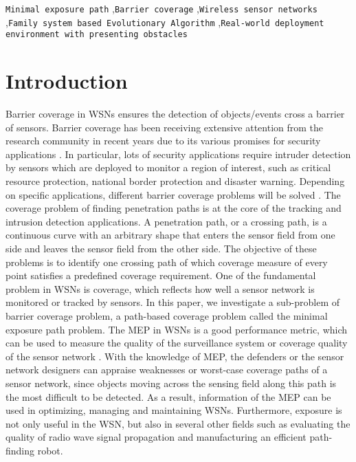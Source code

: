 \documentclass[final]{elsarticle}
\begin{document}
\begin{frontmatter}
\begin{abstract}
\end{abstract}
\begin{keyword}
\texttt{Minimal exposure path} \sep\texttt{Barrier coverage} \sep \texttt{Wireless sensor networks} \sep \texttt{Family system based Evolutionary Algorithm} \sep \texttt{Real-world deployment environment with presenting obstacles}
\end{keyword}
\end{frontmatter}
\section{Introduction}
Barrier coverage in WSNs ensures the detection of objects/events cross a barrier of sensors. Barrier coverage has been receiving extensive attention from the research community in recent years due to its various promises for security applications \cite{wu2016survey,wang2011coverage,b15}. In particular, lots of security applications require intruder detection by sensors which are deployed to monitor a region of interest, such as critical resource protection, national border protection and disaster warning. Depending on specific applications, different barrier coverage problems will be solved . The coverage problem of finding penetration paths is at the core of the tracking and intrusion detection applications. A penetration path, or a crossing path, is a continuous curve with an arbitrary shape that enters the sensor field from one side and leaves the sensor field from the other side. The objective of these problems is to identify one crossing path of which coverage measure of every point satisfies a predefined coverage requirement. One of the fundamental problem in WSNs is coverage, which reflects how well a sensor network is monitored or tracked by sensors. In this paper, we investigate a sub-problem of barrier coverage problem, a path-based coverage problem called the minimal exposure path problem. The MEP in WSNs is a good performance metric, which can be used to measure the quality of the surveillance system or coverage quality of the sensor network \cite{b13,b17}. With the knowledge of MEP, the defenders or the sensor network designers can appraise weaknesses or worst-case coverage paths of a sensor network, since objects moving across the sensing field along this path is the most difficult to be detected. As a result, information of the MEP can be used in optimizing, managing and maintaining WSNs. Furthermore, exposure is not only useful in the WSN, but also in several other fields such as evaluating the quality of radio wave signal propagation and manufacturing an efficient path-finding robot.
\end{document}
